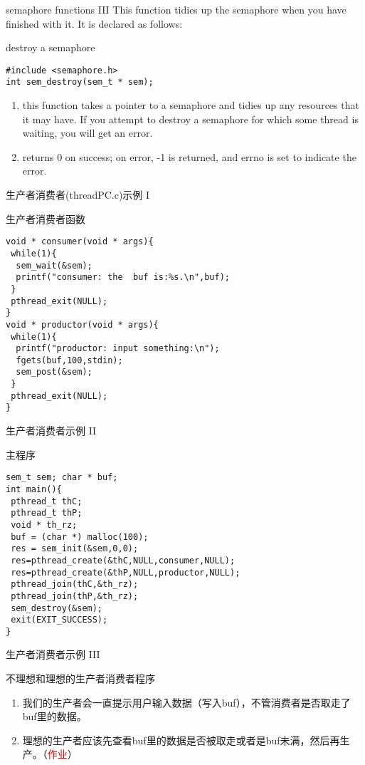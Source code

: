 \documentclass{beamer}
\begin{document}
\begin{frame}[fragile]{semaphore functions III}
This function tidies up the semaphore when you have finished with it. It is declared as follows:
\begin{block}{destroy a semaphore}
\begin{verbatim}
#include <semaphore.h>
int sem_destroy(sem_t * sem);
\end{verbatim}
\end{block}
\begin{enumerate}
\item
this function takes a pointer to a semaphore and tidies up any resources that it may have. If you attempt to destroy a semaphore for which some thread is waiting, you will get an error.
\item
returns 0 on success; on error, -1 is returned, and errno is set to indicate the error.
\end{enumerate}

\end{frame}
\begin{frame}[fragile]{生产者消费者(threadPC.c)示例 I}
\begin{block}{生产者消费者函数}
\begin{verbatim}
void * consumer(void * args){
 while(1){
  sem_wait(&sem);
  printf("consumer: the  buf is:%s.\n",buf);
 }
 pthread_exit(NULL);
}
void * productor(void * args){
 while(1){
  printf("productor: input something:\n");
  fgets(buf,100,stdin);
  sem_post(&sem);
 }
 pthread_exit(NULL);
}
\end{verbatim}
\end{block}
\end{frame}
\begin{frame}[fragile]{生产者消费者示例 II}
\begin{block}{主程序}
\begin{verbatim}
sem_t sem; char * buf;
int main(){
 pthread_t thC;
 pthread_t thP;
 void * th_rz;
 buf = (char *) malloc(100);
 res = sem_init(&sem,0,0);
 res=pthread_create(&thC,NULL,consumer,NULL);
 res=pthread_create(&thP,NULL,productor,NULL);
 pthread_join(thC,&th_rz);
 pthread_join(thP,&th_rz);
 sem_destroy(&sem);
 exit(EXIT_SUCCESS);
}
\end{verbatim}
\end{block}
\end{frame}
\begin{frame}[fragile]{生产者消费者示例 III}
\begin{block}{不理想和理想的生产者消费者程序}
\begin{enumerate}
\item
我们的生产者会一直提示用户输入数据（写入buf），不管消费者是否取走了buf里的数据。
\item
理想的生产者应该先查看buf里的数据是否被取走或者是buf未满，然后再生产。（\textcolor{red}{作业}）
\end{enumerate}
\end{block}
\end{frame}
\end{document}
